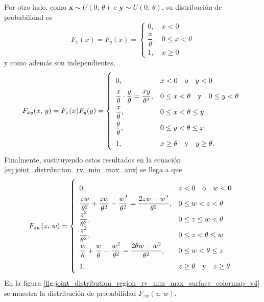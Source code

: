 \documentclass[a4paper]{report}
\newcommand{\x}{\mathbf{x}}
\newcommand{\y}{\mathbf{y}}
\begin{document}
Por otro lado, como \(\x\sim U(0,\,\theta)\) e \(\y\sim U(0,\,\theta)\), su distribución de probabilidad es
\[
 F_x(x)=F_y(x)=\left\{\begin{array}{ll}
  0, & x<0 \\
  \dfrac{x}{\theta}, & 0\leq x<\theta\\
  1, & x\geq 0
 \end{array} \right.
\]
y como además son independientes, 
\[
\def\arraystretch{1.8}
 F_{xy}(x,\,y)=F_x(x)F_y(y)=\left\{\begin{array}{ll}
  0, & x<0\quad\textrm{o}\quad y<0 \\
  \dfrac{x}{\theta}\cdot\dfrac{y}{\theta}=\dfrac{xy}{\theta^2}, & 0\leq x<\theta\quad\textrm{y}\quad 0\leq y<\theta\\
  \dfrac{x}{\theta}, & 0\leq x<\theta\leq y\\
  \dfrac{y}{\theta}, & 0\leq y<\theta\leq x\\
  1, & x\geq\theta\quad\textrm{y}\quad y\geq\theta.
 \end{array} \right.
\]
Finalmente, sustituyendo estos resultados en la ecuación \ref{eq:joint_distribution_rv_min_max_aux} se llega a que
\begin{equation}\label{eq:joint_distribution_rv_min_max}
 \def\arraystretch{1.8}
 F_{zw}(z,\,w)=\left\{\begin{array}{ll}
  0, & z<0\quad\textrm{o}\quad w<0 \\
  \dfrac{zw}{\theta^2}+\dfrac{zw}{\theta^2}-\dfrac{w^2}{\theta^2}=\dfrac{2zw-w^2}{\theta^2},& 0\leq w<z<\theta\\
  \dfrac{z^2}{\theta^2},& 0\leq z\leq w<\theta\\
  \dfrac{z^2}{\theta^2}, & 0\leq z<\theta\leq w\\
  \dfrac{w}{\theta}+\dfrac{w}{\theta}-\dfrac{w^2}{\theta^2}=\dfrac{2\theta w-w^2}{\theta^2}, & 0\leq w<\theta\leq z\\
  1, & z\geq\theta\quad\textrm{y}\quad z\geq\theta.
 \end{array} \right.
\end{equation}
En la figura \ref{fig:joint_distribution_region_rv_min_max_surface_colormap_v4} se muestra la distribución de probabilidad \(F_{zw}(z,\,w)\).
\end{document}
